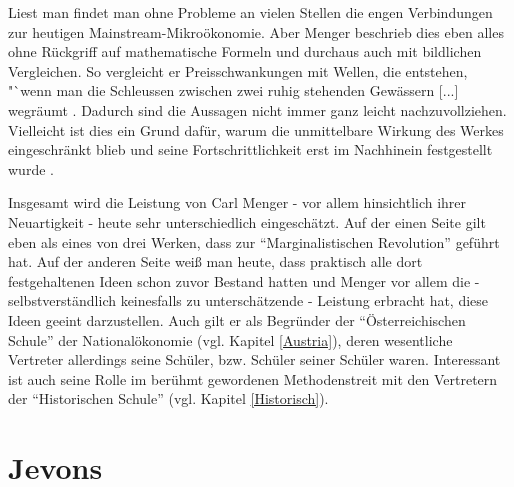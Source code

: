 Liest man \textcite{Menger1871} findet man ohne Probleme an vielen Stellen die engen Verbindungen zur heutigen Mainstream-Mikroökonomie. Aber Menger beschrieb dies eben alles ohne Rückgriff auf mathematische Formeln und durchaus auch mit bildlichen Vergleichen. So vergleicht er Preisschwankungen mit Wellen, die entstehen, "`wenn man die Schleussen zwischen zwei ruhig stehenden Gewässern [...] wegräumt \parencite[S. 172]{Menger1871}. Dadurch sind die Aussagen nicht immer ganz leicht nachzuvollziehen. Vielleicht ist dies ein Grund dafür, warum die unmittelbare Wirkung des Werkes eingeschränkt blieb und seine Fortschrittlichkeit erst im Nachhinein festgestellt wurde \parencite[S. 304]{Rosner2012}. 

Insgesamt wird die Leistung von Carl Menger - vor allem hinsichtlich ihrer Neuartigkeit - heute sehr unterschiedlich eingeschätzt. Auf der einen Seite gilt \textcite{Menger1871} eben als eines von drei Werken, dass  zur "`Marginalistischen Revolution"' geführt hat. Auf der anderen Seite weiß man heute, dass praktisch alle dort festgehaltenen Ideen schon zuvor Bestand hatten und Menger vor allem die - selbstverständlich keinesfalls zu unterschätzende - Leistung erbracht hat, diese Ideen geeint darzustellen. Auch gilt er als Begründer der "`Österreichischen Schule"' der Nationalökonomie (vgl. Kapitel \ref{Austria}), deren wesentliche Vertreter allerdings seine Schüler, bzw. Schüler seiner Schüler waren. Interessant ist auch seine Rolle im berühmt gewordenen Methodenstreit mit den Vertretern der "`Historischen Schule"' (vgl. Kapitel \ref{Historisch}). 

\section{Jevons}
\label{Jevons}

